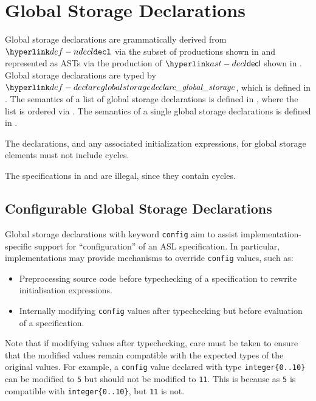 \chapter{Global Storage Declarations\label{chap:GlobalStorageDeclarations}}

Global storage declarations are grammatically derived from $\Ndecl$ via the subset of productions shown in
 and represented as ASTs via the production of $\decl$
shown in .
%
Global storage declarations are typed by $\declareglobalstorage$, which is defined in .
%
The semantics of a list of global storage declarations is defined in ,
where the list is ordered via .
The semantics of a single global storage declarations is defined in .

 
The declarations, and any associated initialization expressions, for global storage elements must not include cycles.

The specifications in  and 
are illegal, since they contain cycles.

\section{Configurable Global Storage Declarations\label{sec:ConfigurableGlobalStorageDeclarations}}
Global storage declarations with keyword \texttt{config} aim to assist implementation-specific support for ``configuration'' of an ASL specification.
In particular, implementations may provide mechanisms to override \texttt{config} values, such as:
\begin{itemize}
  \item Preprocessing source code before typechecking of a specification to rewrite initialisation expressions.
  \item Internally modifying \texttt{config} values after typechecking but before evaluation of a specification.
\end{itemize}
Note that if modifying values after typechecking, care must be taken to ensure that the modified values remain compatible with the expected types of the original values.
For example, a \texttt{config} value declared with type \verb|integer{0..10}| can be modified to \texttt{5} but should not be modified to \texttt{11}.
This is because as \texttt{5} is compatible with \verb|integer{0..10}|, but \texttt{11} is not.

